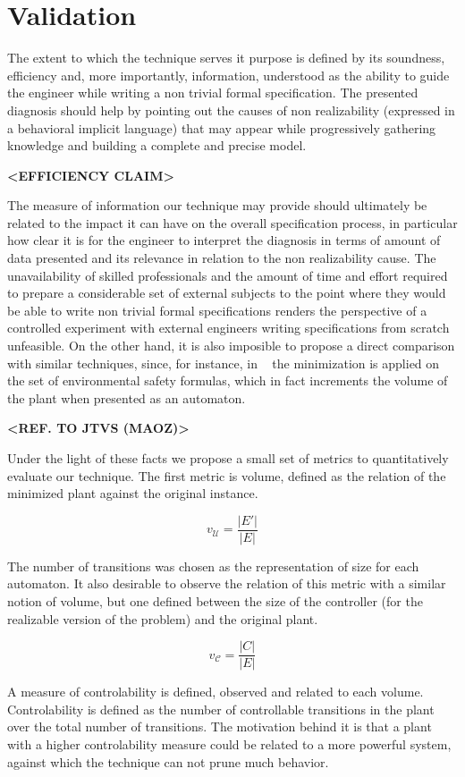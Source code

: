 \newpage 
\section{Validation}
The extent to which the technique serves it purpose is defined by its soundness, efficiency and, more importantly, information, understood as the ability to guide the engineer while writing a non trivial formal specification. The presented diagnosis should help by pointing out the causes of non realizability (expressed in a behavioral implicit language) that may appear while progressively gathering knowledge and building a complete and precise model.

\textbf{<EFFICIENCY CLAIM>}

The measure of information our technique may provide should ultimately be related to the impact it can have on the overall specification process, in particular how clear it is for the engineer  to interpret the diagnosis in terms of amount of data presented and its relevance in relation to the non realizability cause. The unavailability of skilled professionals and the amount of time and effort required to prepare a considerable set of external subjects to the point where they would be able to write non trivial formal specifications renders the perspective of a controlled experiment with external engineers writing specifications from scratch unfeasible. On the other hand, it is also imposible to propose a direct comparison with similar techniques, since, for instance, in ~\cite{DBLP:conf/hvc/KonighoferHB10} the minimization is applied on the set of environmental safety formulas, which in fact increments the volume of the plant when presented as an automaton. 

\textbf{<REF. TO JTVS (MAOZ)>}

Under the light of these facts we propose a small set of metrics to quantitatively evaluate our technique. The first metric is volume, defined as the relation of the minimized plant against the original instance.

\[ v_{\mathcal{U}} = \dfrac{|E'|}{|E|} \]

The number of transitions was chosen as the representation of size for each automaton. It also desirable to observe the relation of this metric with a similar notion of volume, but one defined between the size of the controller (for the realizable version of the problem) and the original plant.

\[ v_{\mathcal{C}} = \dfrac{|C|}{|E|} \]

A measure of controlability is defined, observed and related to each volume. Controlability is defined as the number of controllable transitions in the plant over the total number of transitions. The motivation behind it is that a plant with a higher controlability measure could be related to a more powerful system, against which the technique can not prune much behavior.

